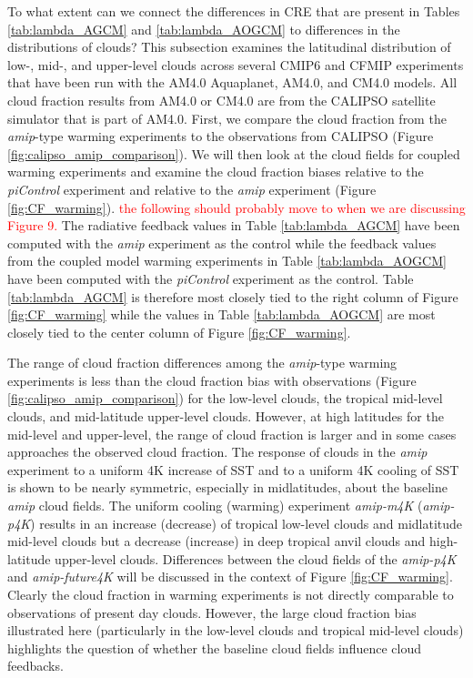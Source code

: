 \documentclass[draft]{agujournal2019}
\begin{document}
To what extent can we connect the differences in CRE that are present in Tables  \ref{tab:lambda_AGCM} and \ref{tab:lambda_AOGCM} 
to differences in the distributions of clouds?  This subsection examines the latitudinal distribution of low-, mid-, and upper-level clouds across 
several CMIP6 and CFMIP experiments that have been run with the AM4.0 Aquaplanet, AM4.0, and CM4.0 models.  
All cloud fraction results from AM4.0 or CM4.0 are from the CALIPSO satellite simulator that is part of AM4.0.   
First, we compare the cloud fraction from the \textit{amip}-type warming experiments to the observations from CALIPSO (Figure 
\ref{fig:calipso_amip_comparison}).   We will then look at the cloud fields for coupled warming experiments and examine the cloud fraction 
biases relative to the \textit{piControl} experiment and relative to the \textit{amip} experiment (Figure \ref{fig:CF_warming}).   
\textcolor{red}{the following should probably move to when we are discussing Figure 9.}
 The radiative 
feedback values in Table \ref{tab:lambda_AGCM} have been computed with the \textit{amip} experiment as the control while the feedback
values from the coupled model warming experiments in Table \ref{tab:lambda_AOGCM} have been computed with the \textit{piControl}
experiment as the control.  Table  \ref{tab:lambda_AGCM} is therefore most closely tied to the right column of Figure \ref{fig:CF_warming} 
while the values in Table  \ref{tab:lambda_AOGCM} are most closely tied to the center column of Figure \ref{fig:CF_warming}. 

The range of cloud fraction differences among the \textit{amip}-type warming experiments is less than the cloud fraction bias with 
observations (Figure \ref{fig:calipso_amip_comparison}) for the low-level clouds, the tropical mid-level clouds, and mid-latitude upper-level 
clouds.  However, at high latitudes for the mid-level and upper-level, the range of cloud fraction is larger and in some cases approaches 
the observed cloud fraction.  The response of clouds in the \textit{amip} experiment to a uniform 4K increase of SST and to a uniform
4K cooling of SST is shown to be nearly symmetric, especially in midlatitudes, about the baseline \textit{amip} cloud fields.     
The uniform cooling (warming) experiment \textit{amip-m4K} (\textit{amip-p4K}) results in an increase (decrease) of tropical low-level clouds 
and midlatitude mid-level clouds but a decrease (increase) in deep tropical anvil clouds and high-latitude upper-level clouds.  
Differences between the cloud fields of the \textit{amip-p4K} and \textit{amip-future4K} will be discussed in the context of Figure \ref{fig:CF_warming}.
Clearly the cloud fraction in warming experiments is not directly comparable to observations of
present day clouds.  However, the large cloud fraction bias illustrated here (particularly in the low-level clouds and tropical mid-level clouds) 
highlights the question of whether the baseline cloud fields influence cloud feedbacks.  
 
\end{document}
